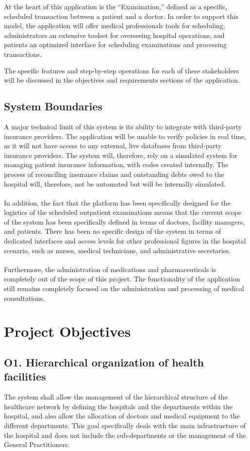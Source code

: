 \documentclass[12pt, a4paper]{article}
\begin{document}
At the heart of this application is the ``Examination,'' defined as a specific, scheduled transaction between a patient and a doctor. In order to support this model, the application will offer medical professionals tools for scheduling, administrators an extensive toolset for overseeing hospital operations, and patients an optimized interface for scheduling examinations and processing transactions.

The specific features and step-by-step operations for each of these stakeholders will be discussed in the objectives and requirements sections of the application.

\subsection{System Boundaries}
A major technical limit of this system is its ability to integrate with third-party insurance providers. The application will be unable to verify policies in real time, as it will not have access to any external, live databases from third-party insurance providers. The system will, therefore, rely on a simulated system for managing patient insurance information, with codes created internally. The process of reconciling insurance claims and outstanding debts owed to the hospital will, therefore, not be automated but will be internally simulated.
\\ \\
In addition, the fact that the platform has been specifically designed for the logistics of the scheduled outpatient examinations means that the current scope of the system has been specifically defined in terms of doctors, facility managers, and patients. There has been no specific design of the system in terms of dedicated interfaces and access levels for other professional figures in the hospital scenario, such as nurses, medical technicians, and administrative secretaries.
\\ \\      
Furthermore, the administration of medications and pharmaceuticals is completely out of the scope of this project. The functionality of the application still remains completely focused on the administration and processing of medical consultations.
\newpage
\section{Project Objectives}

\subsection{O1. Hierarchical organization of health facilities} \label{O1}
The system shall allow the management of the hierarchical structure of the healthcare network by defining the hospitals and the departments within the hospital, and also allow the allocation of doctors and medical equipment to the different departments. This goal specifically deals with the main infrastructure of the hospital and does not include the sub-departments or the management of the General Practitioners.
\end{document}
